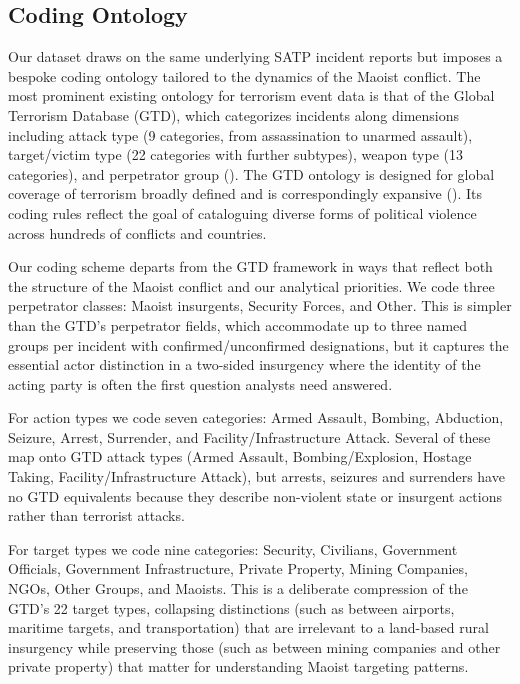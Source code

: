 \documentclass[
  11pt,
]{article}
\begin{document}
\subsection{Coding Ontology}\label{coding-ontology}

Our dataset draws on the same underlying SATP incident reports but
imposes a bespoke coding ontology tailored to the dynamics of the Maoist
conflict. The most prominent existing ontology for terrorism event data
is that of the Global Terrorism Database (GTD), which categorizes
incidents along dimensions including attack type (9 categories, from
assassination to unarmed assault), target/victim type (22 categories
with further subtypes), weapon type (13 categories), and perpetrator
group (). The GTD
ontology is designed for global coverage of terrorism broadly defined
and is correspondingly expansive ().
Its coding rules reflect the goal of cataloguing diverse forms of
political violence across hundreds of conflicts and countries.

Our coding scheme departs from the GTD framework in ways that reflect
both the structure of the Maoist conflict and our analytical priorities.
We code three perpetrator classes: Maoist insurgents, Security Forces,
and Other. This is simpler than the GTD's perpetrator fields, which
accommodate up to three named groups per incident with
confirmed/unconfirmed designations, but it captures the essential actor
distinction in a two-sided insurgency where the identity of the acting
party is often the first question analysts need answered.

For action types we code seven categories: Armed Assault, Bombing,
Abduction, Seizure, Arrest, Surrender, and Facility/Infrastructure
Attack. Several of these map onto GTD attack types (Armed Assault,
Bombing/Explosion, Hostage Taking, Facility/Infrastructure Attack), but
arrests, seizures and surrenders have no GTD equivalents because they
describe non-violent state or insurgent actions rather than terrorist
attacks.

For target types we code nine categories: Security, Civilians,
Government Officials, Government Infrastructure, Private Property,
Mining Companies, NGOs, Other Groups, and Maoists. This is a deliberate
compression of the GTD's 22 target types, collapsing distinctions (such
as between airports, maritime targets, and transportation) that are
irrelevant to a land-based rural insurgency while preserving those (such
as between mining companies and other private property) that matter for
understanding Maoist targeting patterns.
\end{document}
